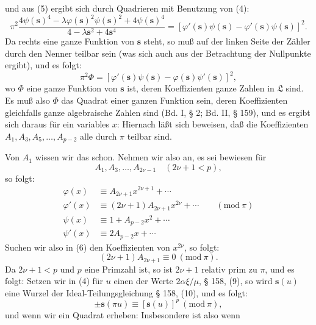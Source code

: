 und aus (5) ergibt sich durch Quadrieren mit Benutzung von (4):
\[
\pi^2 \frac{4\psi(\boldsymbol{s})^4 - \lambda\varphi(\boldsymbol{s})^2\psi(\boldsymbol{s})^2 + 4\psi(\boldsymbol{s})^4}{4 - \lambda \boldsymbol{s}^2 + 4\boldsymbol{s}^4} = [\varphi'(\boldsymbol{s})\psi(\boldsymbol{s}) - \varphi'(\boldsymbol{s})\psi(\boldsymbol{s})]^2. %
\]
Da rechts eine ganze Funktion von $\boldsymbol{s}$ steht, so muß auf der linken Seite der Zähler durch den Nenner teilbar sein (was sich auch aus der Betrachtung der Nullpunkte ergibt), und es folgt:
\[
\pi^2 \Phi = [\varphi'(\boldsymbol{s})\psi(\boldsymbol{s}) - \varphi(\boldsymbol{s})\psi'(\boldsymbol{s})]^2,
\]
wo $\Phi$ eine ganze Funktion von $\boldsymbol{s}$ ist, deren Koeffizienten ganze Zahlen in $\mathfrak{L}$ sind. Es muß also $\Phi$ das Quadrat einer ganzen Funktion sein, deren Koeffizienten gleichfalls ganze algebraische Zahlen sind (Bd. I, § 2; Bd. II, § 159), und es ergibt sich daraus für ein variables $x$:
Hiernach läßt sich beweisen, daß die Koeffizienten $A_1, A_3, A_5, \ldots, A_{p-2}$ alle durch $\pi$ teilbar sind.

Von $A_1$ wissen wir das schon. Nehmen wir also an, es sei bewiesen für
\[
A_1, A_3, \ldots, A_{2\nu-1} \quad (2\nu+1 < p),
\]
so folgt:
\[
\begin{aligned}
\varphi(x) &\equiv A_{2\nu+1}x^{2\nu+1} + \cdots\\
\varphi'(x) &\equiv (2\nu+1)A_{2\nu+1}x^{2\nu} + \cdots \qquad (\mathrm{mod}\ \pi)\\
\psi(x) &\equiv 1 + A_{p-2}x^2 + \cdots\\
\psi'(x) &\equiv 2A_{p-2}x + \cdots
\end{aligned}
\]
Suchen wir also in (6) den Koeffizienten von $x^{2\nu}$, so folgt:
\[
(2\nu+1)A_{2\nu+1} \equiv 0 \ (\mathrm{mod}\ \pi).
\]
Da $2\nu+1 < p$ und $p$ eine Primzahl ist, so ist $2\nu+1$ relativ prim zu $\pi$, und es folgt:
Setzen wir in (4) für $u$ einen der Werte $2\alpha\xi/\mu$, § 158, (9), so wird $\boldsymbol{s}(u)$ eine Wurzel der Ideal-Teilungsgleichung § 158, (10), und es folgt:
\[
\pm \boldsymbol{s}(\pi u) \equiv [\boldsymbol{s}(u)]^p \ (\mathrm{mod}\ \pi),
\]
und wenn wir ein Quadrat erheben:
Insbesondere ist also
wenn
